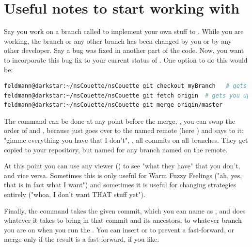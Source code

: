\documentclass[a4paper, 11pt, DIV=11]{scrartcl}
\begin{document}
\section{Useful notes to start working with }
\label{app:git}

Say you work on a branch called  to implement your own stuff to \nsc.
While you are working, the  branch or any other branch has been changed
by you or by any other developer. Say a bug was fixed in another part of the code.
Now, you want to incorporate this bug fix to your current status of .
One option to do this would be:
\begin{lstlisting}[language=bash]
feldmann@darkstar:~/nsCouette/nsCouette git checkout myBranch   # gets you on your branch
feldmann@darkstar:~/nsCouette/nsCouette git fetch origin  # gets you up to date
feldmann@darkstar:~/nsCouette/nsCouette git merge origin/master
\end{lstlisting}
The  command can be done at any point before the merge, \ie, you can swap the order
of  and , because  just goes over to the named
remote (here ) and says to it: "gimme everything you have that I don't", \ie,
all commits on all branches. They get copied to your repository, but named 
for any branch named  on the remote.
\par
At this point you can use any viewer (\eg {}) to see "what they have" that you don't,
and vice versa. Sometimes this is only useful for Warm Fuzzy Feelings ("ah, yes, that is in fact
what I want") and sometimes it is useful for changing strategies entirely ("whoa, I don't want
THAT stuff yet").
\par
Finally, the  command takes the given commit, which you can name as ,
and does whatever it takes to bring in that commit and its ancestors, to whatever branch you are on
when you run the . You can insert  or  to prevent a
fast-forward, or merge only if the result is a fast-forward, if you like.



\end{document}
